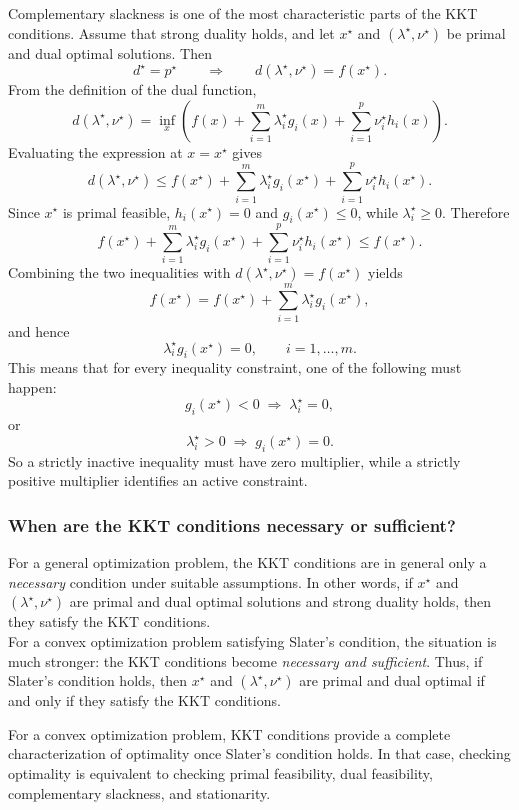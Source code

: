 Complementary slackness is one of the most characteristic parts of the KKT conditions. Assume that strong duality holds, and let \(x^\star\) and \((\lambda^\star,\nu^\star)\) be primal and dual optimal solutions. Then
\[
d^\star = p^\star
\qquad\Longrightarrow\qquad
d(\lambda^\star,\nu^\star)=f(x^\star).
\]
From the definition of the dual function,
\[
d(\lambda^\star,\nu^\star)
=
\inf_x
\left(
f(x)
+
\sum_{i=1}^m \lambda_i^\star g_i(x)
+
\sum_{i=1}^p \nu_i^\star h_i(x)
\right).
\]
Evaluating the expression at \(x=x^\star\) gives
\[
d(\lambda^\star,\nu^\star)
\le
f(x^\star)
+
\sum_{i=1}^m \lambda_i^\star g_i(x^\star)
+
\sum_{i=1}^p \nu_i^\star h_i(x^\star).
\]
Since \(x^\star\) is primal feasible, \(h_i(x^\star)=0\) and \(g_i(x^\star)\le 0\), while \(\lambda_i^\star\ge 0\). Therefore
\[
f(x^\star)
+
\sum_{i=1}^m \lambda_i^\star g_i(x^\star)
+
\sum_{i=1}^p \nu_i^\star h_i(x^\star)
\le f(x^\star).
\]
Combining the two inequalities with \(d(\lambda^\star,\nu^\star)=f(x^\star)\) yields
\[
f(x^\star)
=
f(x^\star)
+
\sum_{i=1}^m \lambda_i^\star g_i(x^\star),
\]
and hence
\[
\lambda_i^\star g_i(x^\star)=0,
\qquad i=1,\dots,m.
\]
This means that for every inequality constraint, one of the following must happen:
\[
g_i(x^\star)<0 \;\Longrightarrow\; \lambda_i^\star=0,
\]
or
\[
\lambda_i^\star>0 \;\Longrightarrow\; g_i(x^\star)=0.
\]
So a strictly inactive inequality must have zero multiplier, while a strictly positive multiplier identifies an active constraint.

\subsubsection{When are the KKT conditions necessary or sufficient?}

For a general optimization problem, the KKT conditions are in general only a \emph{necessary} condition under suitable assumptions. In other words, if \(x^\star\) and \((\lambda^\star,\nu^\star)\) are primal and dual optimal solutions and strong duality holds, then they satisfy the KKT conditions.\\

For a convex optimization problem satisfying Slater's condition, the situation is much stronger: the KKT conditions become \emph{necessary and sufficient}. Thus, if Slater's condition holds, then \(x^\star\) and \((\lambda^\star,\nu^\star)\) are primal and dual optimal if and only if they satisfy the KKT conditions.

\begin{theorembox}
For a convex optimization problem, KKT conditions provide a complete characterization of optimality once Slater's condition holds. In that case, checking optimality is equivalent to checking primal feasibility, dual feasibility, complementary slackness, and stationarity.
\end{theorembox}

